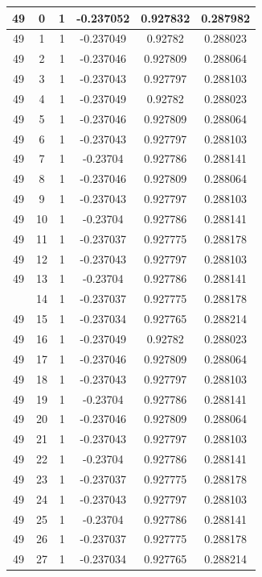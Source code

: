 \documentclass[12pt,a4paper]{article}
\numberwithin{equation}{section}
\numberwithin{figure}{section}
\numberwithin{table}{section}
\begin{document}
\begin{longtable}{|c|c|c|c|c|c|}
49 & 0 & 1 & -0.237052 & 0.927832 & 0.287982 \\ \hline
49 & 1 & 1 & -0.237049 & 0.92782 & 0.288023 \\ \hline
49 & 2 & 1 & -0.237046 & 0.927809 & 0.288064 \\ \hline
49 & 3 & 1 & -0.237043 & 0.927797 & 0.288103 \\ \hline
49 & 4 & 1 & -0.237049 & 0.92782 & 0.288023 \\ \hline
49 & 5 & 1 & -0.237046 & 0.927809 & 0.288064 \\ \hline
49 & 6 & 1 & -0.237043 & 0.927797 & 0.288103 \\ \hline
49 & 7 & 1 & -0.23704 & 0.927786 & 0.288141 \\ \hline
49 & 8 & 1 & -0.237046 & 0.927809 & 0.288064 \\ \hline
49 & 9 & 1 & -0.237043 & 0.927797 & 0.288103 \\ \hline
49 & 10 & 1 & -0.23704 & 0.927786 & 0.288141 \\ \hline
49 & 11 & 1 & -0.237037 & 0.927775 & 0.288178 \\ \hline
49 & 12 & 1 & -0.237043 & 0.927797 & 0.288103 \\ \hline
49 & 13 & 1 & -0.23704 & 0.927786 & 0.288141 \\ \hline
\pagebreak
49 & 14 & 1 & -0.237037 & 0.927775 & 0.288178 \\ \hline
49 & 15 & 1 & -0.237034 & 0.927765 & 0.288214 \\ \hline
49 & 16 & 1 & -0.237049 & 0.92782 & 0.288023 \\ \hline
49 & 17 & 1 & -0.237046 & 0.927809 & 0.288064 \\ \hline
49 & 18 & 1 & -0.237043 & 0.927797 & 0.288103 \\ \hline
49 & 19 & 1 & -0.23704 & 0.927786 & 0.288141 \\ \hline
49 & 20 & 1 & -0.237046 & 0.927809 & 0.288064 \\ \hline
49 & 21 & 1 & -0.237043 & 0.927797 & 0.288103 \\ \hline
49 & 22 & 1 & -0.23704 & 0.927786 & 0.288141 \\ \hline
49 & 23 & 1 & -0.237037 & 0.927775 & 0.288178 \\ \hline
49 & 24 & 1 & -0.237043 & 0.927797 & 0.288103 \\ \hline
49 & 25 & 1 & -0.23704 & 0.927786 & 0.288141 \\ \hline
49 & 26 & 1 & -0.237037 & 0.927775 & 0.288178 \\ \hline
49 & 27 & 1 & -0.237034 & 0.927765 & 0.288214 \\ \hline

\end{longtable}
\end{document}
